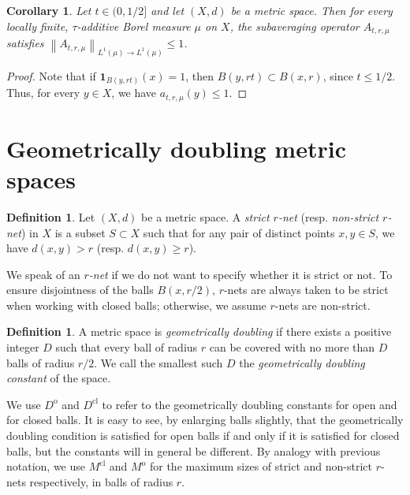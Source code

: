 \documentclass[12pt]{amsart}
\newtheorem{corollary}[theorem]{Corollary}
\theoremstyle{definition}
\newtheorem{definition}[theorem]{Definition}
\theoremstyle{parrafo}
\begin{document}
	
\begin{corollary}\label{sub} 
	Let $t \in (0,1/2]$ and let $(X,d)$ be a metric space. Then for every locally finite, $\tau$-additive Borel measure $\mu$ on $X$, the subaveraging operator $A_{t,r, \mu}$ satisfies  $\left \|  A_{t,r, \mu}\right \|_{L^1(\mu) \rightarrow L^1(\mu)} \le 1$.
\end{corollary}

\begin{proof} Note that if $\mathbf{1}_{B(y,rt)}(x) = 1$, then $B(y,rt) \subset B(x,r)$, since $t \le 1/2$. Thus, for every
$y \in X$,  we have $a_{t,r, \mu} (y) \le 1$.
\end{proof}


	\section{Geometrically doubling metric spaces}
	
	\begin{definition} Let $(X, d)$ be a metric space. A {\em strict $r$-net} (resp. {\em non-strict $r$-net}) 
		in $X$ is a subset $S \subset X$ such that for any pair of distinct points $x,y \in S$, we have $d(x,y) > r$  (resp. $d(x,y)  \ge r$). 
	\end{definition} 
	
	We  speak of an {\em $r$-net}   if we do not want to specify whether it is strict or not.
	To ensure disjointness of the balls $B(x,r/2)$,  $r$-nets are always  taken to be strict when working with closed balls;
	otherwise, we assume $r$-nets are
	non-strict.
	
	\begin{definition} \label{geomdoub} A metric space is {\it geometrically doubling}  if there exists a positive
		integer $D$ such that every ball of radius $r$ can be covered with no more than $D$ balls
		of radius $r/2$.  We call the smallest such $D$ the {\em geometrically doubling constant} of the space.
	\end{definition}
	
		We use $D^{\operatorname{o}}$ and $D^{\operatorname{cl}}$  to refer to the geometrically doubling constants for open and for closed balls.
	It is easy to see, by enlarging balls slightly, that the geometrically doubling condition is satisfied for open balls if and only if
	it is satisfied for closed balls, but the constants will in general be different. 
	By analogy with previous notation, we use  $M^{\operatorname{cl}}$   and $M^{\operatorname{o}}$ for 
	the maximum sizes of strict and non-strict $r$-nets
	respectively, in balls of radius $r$.
	
\end{document}

